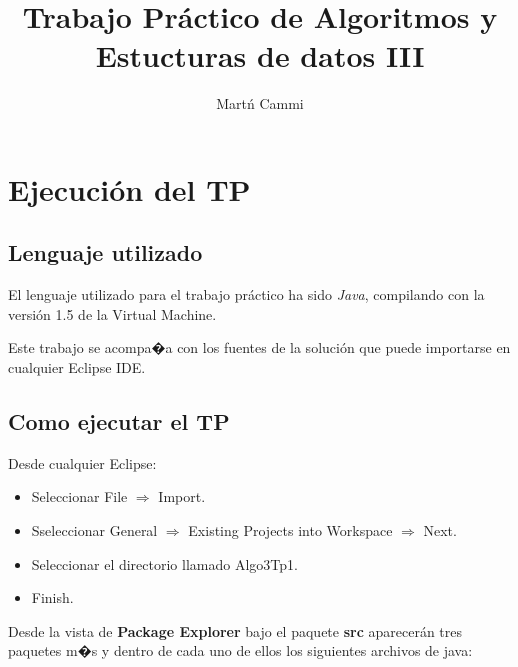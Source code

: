 \documentclass[11pt, a4paper, spanish]{article}
\author{Mart\'n Cammi}
\title{Trabajo Pr\'actico de Algoritmos y Estucturas de datos III}
\begin{document}

\maketitle

\thispagestyle{empty}

\tableofcontents

\newpage


\section{Ejecuci\'on del TP}
\label{sec:ejecucion}

	\subsection{Lenguaje utilizado}
		
		El lenguaje utilizado para el trabajo pr\'actico ha sido \emph{Java}, compilando con la versi\'on 1.5 de la Virtual Machine.
		
		Este trabajo se acompa�a con los fuentes de la soluci\'on que puede importarse en
		cualquier Eclipse IDE. 
		
	\subsection{Como ejecutar el TP}
	
	Desde cualquier Eclipse:
	\begin{itemize}
			\item{Seleccionar File $\Rightarrow$ Import.}
			\item{Sseleccionar General $\Rightarrow$ Existing Projects into Workspace $\Rightarrow$ Next.}
			\item{Seleccionar el directorio llamado Algo3Tp1.}
			\item{Finish.}
		\end{itemize}
	
	Desde la vista de \textbf{Package Explorer} bajo el paquete \textbf{src} aparecer\'an tres paquetes m�s y dentro de cada uno de ellos los siguientes archivos de java:
	
\end{document}
